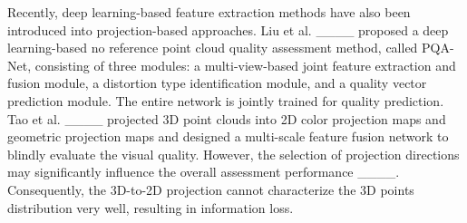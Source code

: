 \begin{table*}[!t]
	\centering
	\caption{Selected publicly accessible PCQA datasets.}
	\label{Tab:existing-dataset}
\end{table*}

Recently, deep learning-based feature extraction methods have also been introduced into projection-based approaches.
Liu et al. ____ proposed a deep learning-based no reference point cloud quality assessment method, called PQA-Net, consisting of three modules: a multi-view-based joint feature extraction and fusion module, a distortion type identification module, and a quality vector prediction module.
The entire network is jointly trained for quality prediction. 
Tao et al. ____ projected 3D point clouds into 2D color projection maps and geometric projection maps and designed a multi-scale feature fusion network to blindly evaluate the visual quality. 
However, the selection of projection directions may significantly influence the overall assessment performance ____.
Consequently, the 3D-to-2D projection cannot characterize the 3D points distribution very well, resulting in information loss.

